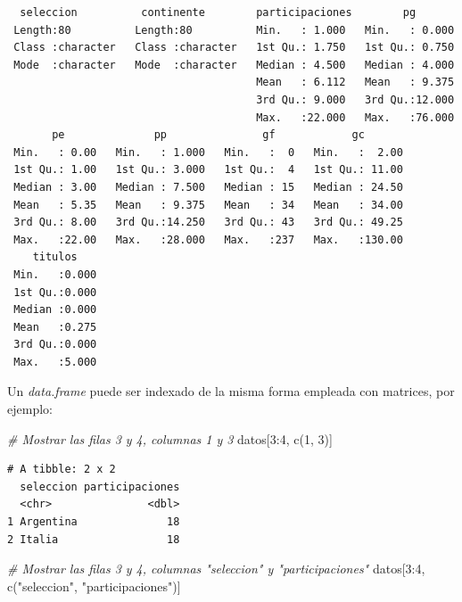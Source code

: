 \documentclass[
]{book}
\newenvironment{Shaded}{\begin{snugshade}}{\end{snugshade}}
\newcommand{\CommentTok}[1]{\textcolor[rgb]{0.56,0.35,0.01}{\textit{#1}}}
\newcommand{\DecValTok}[1]{\textcolor[rgb]{0.00,0.00,0.81}{#1}}
\newcommand{\FunctionTok}[1]{\textcolor[rgb]{0.00,0.00,0.00}{#1}}
\newcommand{\NormalTok}[1]{#1}
\newcommand{\SpecialCharTok}[1]{\textcolor[rgb]{0.00,0.00,0.00}{#1}}
\newcommand{\StringTok}[1]{\textcolor[rgb]{0.31,0.60,0.02}{#1}}
\begin{document}
\begin{verbatim}
  seleccion          continente        participaciones        pg        
 Length:80          Length:80          Min.   : 1.000   Min.   : 0.000  
 Class :character   Class :character   1st Qu.: 1.750   1st Qu.: 0.750  
 Mode  :character   Mode  :character   Median : 4.500   Median : 4.000  
                                       Mean   : 6.112   Mean   : 9.375  
                                       3rd Qu.: 9.000   3rd Qu.:12.000  
                                       Max.   :22.000   Max.   :76.000  
       pe              pp               gf            gc        
 Min.   : 0.00   Min.   : 1.000   Min.   :  0   Min.   :  2.00  
 1st Qu.: 1.00   1st Qu.: 3.000   1st Qu.:  4   1st Qu.: 11.00  
 Median : 3.00   Median : 7.500   Median : 15   Median : 24.50  
 Mean   : 5.35   Mean   : 9.375   Mean   : 34   Mean   : 34.00  
 3rd Qu.: 8.00   3rd Qu.:14.250   3rd Qu.: 43   3rd Qu.: 49.25  
 Max.   :22.00   Max.   :28.000   Max.   :237   Max.   :130.00  
    titulos     
 Min.   :0.000  
 1st Qu.:0.000  
 Median :0.000  
 Mean   :0.275  
 3rd Qu.:0.000  
 Max.   :5.000  
\end{verbatim}

Un \emph{data.frame} puede ser indexado de la misma forma empleada con matrices, por ejemplo:

\begin{Shaded}
\begin{Highlighting}[]
\CommentTok{\# Mostrar las filas 3 y 4, columnas 1 y 3}
\NormalTok{datos[}\DecValTok{3}\SpecialCharTok{:}\DecValTok{4}\NormalTok{, }\FunctionTok{c}\NormalTok{(}\DecValTok{1}\NormalTok{, }\DecValTok{3}\NormalTok{)]}
\end{Highlighting}
\end{Shaded}

\begin{verbatim}
# A tibble: 2 x 2
  seleccion participaciones
  <chr>               <dbl>
1 Argentina              18
2 Italia                 18
\end{verbatim}

\begin{Shaded}
\begin{Highlighting}[]
\CommentTok{\# Mostrar las filas 3 y 4, columnas "seleccion" y "participaciones"}
\NormalTok{datos[}\DecValTok{3}\SpecialCharTok{:}\DecValTok{4}\NormalTok{, }\FunctionTok{c}\NormalTok{(}\StringTok{"seleccion"}\NormalTok{, }\StringTok{"participaciones"}\NormalTok{)]}
\end{Highlighting}
\end{Shaded}
\end{document}
